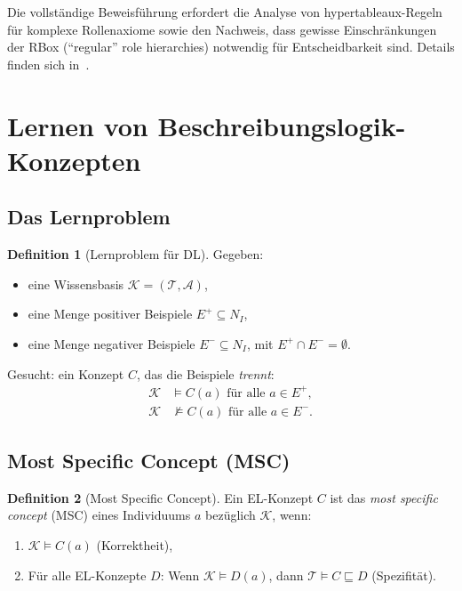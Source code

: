 ﻿\documentclass[a4paper,12pt]{article}
\theoremstyle{definition}
\newtheorem{definition}{Definition}[section]
\theoremstyle{plain}
\theoremstyle{remark}
\newcommand{\Tbox}{\ensuremath{\mathcal{T}}}
\newcommand{\Abox}{\ensuremath{\mathcal{A}}}
\newcommand{\KB}{\ensuremath{\mathcal{K}}}
\begin{document}
Die vollst{\"{a}}ndige Beweisf{\"{u}}hrung erfordert die Analyse von
hypertableaux-Regeln f{\"{u}}r komplexe Rollenaxiome sowie
den Nachweis, dass gewisse Einschr{\"{a}}nkungen der RBox
(``regular'' role hierarchies) notwendig f{\"{u}}r Entscheidbarkeit sind.
Details finden sich in~\cite{Horrocks2006}.

\section{Lernen von Beschreibungslogik-Konzepten}
\label{sec:lernen}

\subsection{Das Lernproblem}

\begin{definition}[Lernproblem f{\"{u}}r DL]
\label{def:lernproblem}
Gegeben:
\begin{itemize}
  \item eine Wissensbasis $\KB = (\Tbox, \Abox)$,
  \item eine Menge positiver Beispiele $E^+ \subseteq N_I$,
  \item eine Menge negativer Beispiele $E^- \subseteq N_I$,
    mit $E^+ \cap E^- = \emptyset$.
\end{itemize}
Gesucht: ein Konzept $C$, das die Beispiele \emph{trennt}:
\begin{align*}
  \KB &\models C(a) \text{ f{\"{u}}r alle } a \in E^+, \\
  \KB &\not\models C(a) \text{ f{\"{u}}r alle } a \in E^-.
\end{align*}
\end{definition}

\subsection{Most Specific Concept (MSC)}

\begin{definition}[Most Specific Concept]
\label{def:msc}
Ein \textsf{EL}-Konzept $C$ ist das \emph{most specific concept}
(MSC) eines Individuums $a$ bez{\"{u}}glich $\KB$, wenn:
\begin{enumerate}[label=(\roman*)]
  \item $\KB \models C(a)$ (Korrektheit),
  \item F{\"{u}}r alle \textsf{EL}-Konzepte $D$:
        Wenn $\KB \models D(a)$, dann $\Tbox \models C \sqsubseteq D$
        (Spezifit{\"{a}}t).
\end{enumerate}
\end{definition}
\end{document}
